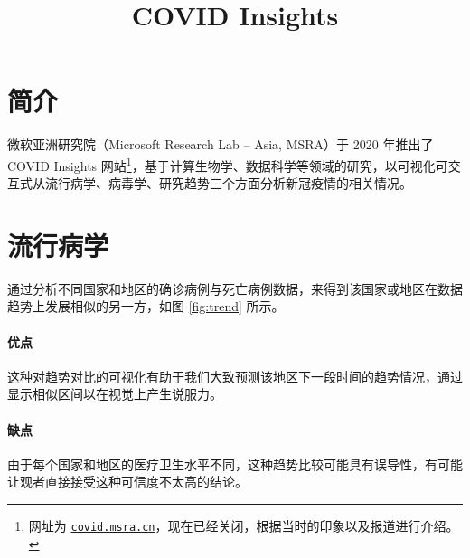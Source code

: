 \endofdump
\geometry{
    right=0.45\paperwidth,
    marginparwidth=0.4\paperwidth
}

    \title{COVID Insights}
    \maketitle

    \section{简介}
    
    微软亚洲研究院（Microsoft Research Lab -- Asia, MSRA）于 2020 年推出了 COVID Insights 网站\footnote{网址为 \href{https://covid.msra.cn}{\texttt{covid.msra.cn}}，现在已经关闭，根据当时的印象以及报道\cite{msracn}进行介绍。}，基于计算生物学、数据科学等领域的研究，以可视化可交互式从流行病学、病毒学、研究趋势三个方面分析新冠疫情的相关情况。
    
    \section{流行病学}

    通过分析不同国家和地区的确诊病例与死亡病例数据，来得到该国家或地区在数据趋势上发展相似的另一方，如图 \ref{fig:trend} 所示。

    \paragraph{优点} 这种对趋势对比的可视化有助于我们大致预测该地区下一段时间的趋势情况，通过显示相似区间以在视觉上产生说服力。

    \paragraph{缺点} 由于每个国家和地区的医疗卫生水平不同，这种趋势比较可能具有误导性，有可能让观者直接接受这种可信度不太高的结论。

